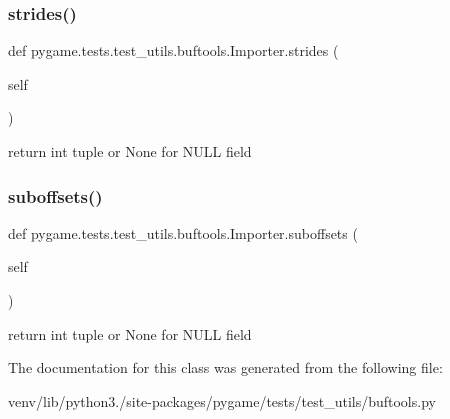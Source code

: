 \subsubsection{\texorpdfstring{strides()}{strides()}}
{\footnotesize\ttfamily def pygame.\+tests.\+test\+\_\+utils.\+buftools.\+Importer.\+strides (\begin{DoxyParamCaption}\item[{}]{self }\end{DoxyParamCaption})}

\begin{DoxyVerb}return int tuple or None for NULL field\end{DoxyVerb}
 \mbox{\label{classpygame_1_1tests_1_1test__utils_1_1buftools_1_1_importer_a36338cb975d85aca51418050ce75fdbb}} 
\subsubsection{\texorpdfstring{suboffsets()}{suboffsets()}}
{\footnotesize\ttfamily def pygame.\+tests.\+test\+\_\+utils.\+buftools.\+Importer.\+suboffsets (\begin{DoxyParamCaption}\item[{}]{self }\end{DoxyParamCaption})}

\begin{DoxyVerb}return int tuple or None for NULL field\end{DoxyVerb}
 

The documentation for this class was generated from the following file\+:\begin{DoxyCompactItemize}
\item 
venv/lib/python3./site-\/packages/pygame/tests/test\+\_\+utils/buftools.\+py\end{DoxyCompactItemize}
